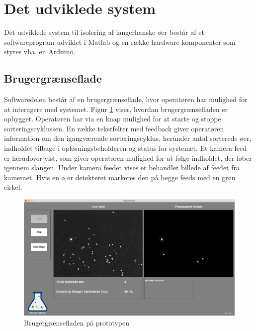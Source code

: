 \section{Det udviklede system}
Det udviklede system til isolering af langerhanske øer består af et softwareprogram udviklet i Matlab og en række hardware komponenter som styres vha. en Arduino.


 
\subsection{Brugergrænseflade} 
Softwaredelen består af en brugergrænseflade, hvor operatøren har mulighed for at interagere med systemet. Figur \ref{fig:finalgui} viser, hvordan brugergrænsefladen er opbygget. Operatøren har via en knap mulighed for at starte og stoppe sorteringscyklussen. En række tekstfelter med feedback giver operatøren information om den igangværende sorteringscyklus, herunder antal sorterede øer, indholdet tilbage i opløsningsbeholderen og status for systemet. Et kamera feed er herudover vist, som giver operatøren mulighed for at følge indholdet, der løber igennem slangen. Under kamera feedet vises et behandlet billede af feedet fra kameraet. Hvis en ø er detekteret markeres den på begge feeds med en grøn cirkel.

 \begin{figure}[H]
	\centering
	\includegraphics[width=1\textwidth]{billeder/gui_main.png}
	\caption{Brugergrænsefladen på prototypen}
	\label{fig:finalgui}
\end{figure}